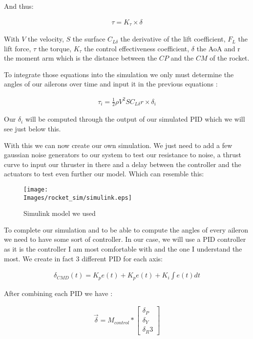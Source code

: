 And thus:

\begin{gather*}
    \tau = K_\tau \times \delta
\end{gather*}

With $V$ the velocity, $S$ the surface $C_{L \delta}$ the derivative of the
lift coefficient, $F_L$ the lift force, $\tau$ the torque, $K_\tau$ the control
effectiveness coefficient, $\delta$ the AoA and r the moment arm which is the
distance between the $CP$ and the $CM$ of the rocket.

To integrate those equations into the simulation we only must determine the
angles of our ailerons over time and input it in the previous equations :

\begin{gather*}
    \tau_i = \frac{1}{2} \rho V^2 S C_{L \delta} r \times \delta_i
\end{gather*}

Our $\delta_i$ will be computed through the output of our simulated PID which
we will see just below this.

With this we can now create our own simulation. We just need to add a few
gaussian noise generators to our system to test our resistance to noise, a
thrust curve to input our thruster in there and a delay between the controller
and the actuators to test even further our model. Which can resemble this:

\begin{figure}[!hbt]
    \centering
    \texttt{[image: \\Images/rocket\_sim/simulink.eps]}
    \caption{Simulink model we used}
\end{figure}
\FloatBarrier

To complete our simulation and to be able to compute the angles of every
aileron we need to have some sort of controller. In our case, we will use a PID
controller as it is the controller I am most comfortable with and the one I
understand the most. We create in fact 3 different PID for each axis:

\begin{gather*}
    \delta_{CMD}(t) = K_p e(t) + K_p e(t) + K_i \int e(t) dt
\end{gather*}

After combining each PID we have :

\begin{gather*}
    \overrightarrow{\delta} = M_{control} *
    \begin{bmatrix}
        \delta_P \\
        \delta_Y \\
        \delta_R 3
    \end{bmatrix}
\end{gather*}

